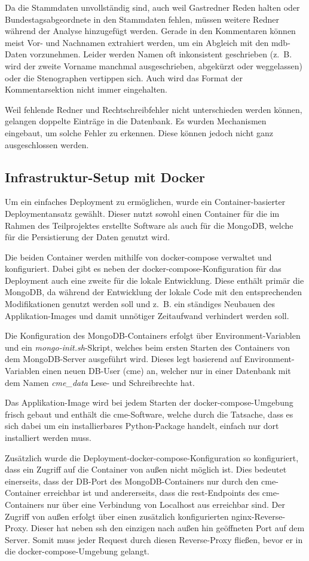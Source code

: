 Da die Stammdaten unvollständig sind, auch weil Gastredner Reden halten oder
Bundestagsabgeordnete in den Stammdaten fehlen, müssen weitere Redner während
der Analyse hinzugefügt werden. Gerade in den Kommentaren können meist Vor-
und Nachnamen extrahiert werden, um ein Abgleich mit den \gls{mdb}-Daten
vorzunehmen. Leider werden Namen oft inkonsistent geschrieben (z.~B. wird
der zweite Vorname manchmal ausgeschrieben, abgekürzt oder weggelassen) oder
die Stenographen vertippen sich. Auch wird das Format der Kommentarsektion
nicht immer eingehalten.

Weil fehlende Redner und Rechtschreibfehler nicht unterschieden werden können,
gelangen doppelte Einträge in die Datenbank. Es wurden Mechanismen eingebaut,
um solche Fehler zu erkennen. Diese können jedoch nicht ganz ausgeschlossen werden.

\subsection{Infrastruktur-Setup mit Docker}
Um ein einfaches Deployment zu ermöglichen, wurde ein Container-basierter
Deploymentansatz gewählt. Dieser nutzt sowohl einen Container für die im
Rahmen des Teilprojektes erstellte Software als auch für die MongoDB, welche
für die Persistierung der Daten genutzt wird.

Die beiden Container werden mithilfe von docker-compose verwaltet und
konfiguriert. Dabei gibt es neben der docker-compose-Konfiguration für das
Deployment auch eine zweite für die lokale Entwicklung. Diese enthält primär
die MongoDB, da während der Entwicklung der lokale Code mit den entsprechenden
Modifikationen genutzt werden soll und z.~B. ein ständiges Neubauen des
Applikation-Images und damit unnötiger Zeitaufwand verhindert werden soll.

Die Konfiguration des MongoDB-Containers erfolgt über Environment-Variablen
und ein \textit{mongo-init.sh}-Skript, welches beim ersten Starten des
Containers von dem MongoDB-Server ausgeführt wird. Dieses legt basierend auf
Environment-Variablen einen neuen DB-User (cme) an, welcher nur in einer
Datenbank mit dem Namen \textit{cme\_data} Lese- und Schreibrechte hat.

Das Applikation-Image wird bei jedem Starten der docker-compose-Umgebung
frisch gebaut und enthält die \gls{cme}-Software, welche durch die Tatsache,
dass es sich dabei um ein installierbares Python-Package handelt, einfach nur
dort installiert werden muss.

Zusätzlich wurde die Deployment-docker-compose-Konfiguration so konfiguriert,
dass ein Zugriff auf die Container von außen nicht möglich ist. Dies bedeutet
einerseits, dass der DB-Port des MongoDB-Containers nur durch den
\gls{cme}-Container erreichbar ist und andererseits, dass die
\gls{rest}-Endpoints des \gls{cme}-Containers nur über eine Verbindung von
Localhost aus erreichbar sind. Der Zugriff von außen erfolgt über einen
zusätzlich konfigurierten nginx-Reverse-Proxy. Dieser hat neben \gls{ssh} den
einzigen nach außen hin geöffneten Port auf dem Server. Somit muss jeder
Request durch diesen Reverse-Proxy fließen, bevor er in die
docker-compose-Umgebung gelangt.

